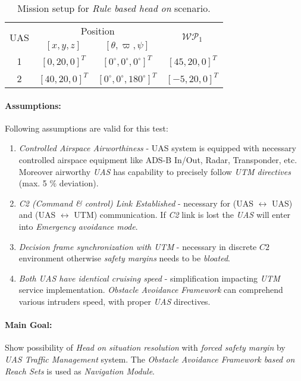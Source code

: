 \begin{table}[H]
    \centering
    \begin{tabular}{c||c|c||c}
        \multirow{2}{*}{UAS} &\multicolumn{2}{c||}{Position} & \multirow{2}{*}{$\mathscr{WP}_1$} \\\cline{2-3}
          & $[x,y,z]$           & $[\theta,\varpi,\psi]$           & \\\hline\hline
        1 & $[0,20,0]^T $       & $[0^\circ,0^\circ,0^\circ]^T$    & $[45,20,0]^T$\\\hline 
        2 & $[40,20,0]^T $       & $[0^\circ,0^\circ,180^\circ]^T$    & $[-5,20,0]^T$\\
    \end{tabular}
    \caption{Mission setup for \emph{Rule based head on} scenario.}
    \label{tab:missionSetupRuleBasedHeadOnScenario}
\end{table}

\paragraph{Assumptions:} Following assumptions are valid for this test:
    
\begin{enumerate}
    \item \emph{Controlled Airspace Airworthiness} - UAS system is equipped with necessary controlled airspace equipment like ADS-B In/Out, Radar, Transponder, etc. Moreover airworthy \emph{UAS} has capability to precisely follow \emph{UTM directives} (max. 5 $\%$ deviation).
    
    \item \emph{C2 (Command \& control) Link Established} - necessary for (UAS $\leftrightarrow$ UAS) and (UAS $\leftrightarrow$ UTM) communication. If \emph{C2} link is lost the \emph{UAS} will enter into \emph{Emergency avoidance mode}.
    
    \item \emph{Decision frame synchronization with UTM} - necessary in discrete $C2$ environment otherwise \emph{safety margins} needs to be \emph{bloated}.
    
    \item \emph{Both UAS have identical cruising speed} - simplification impacting \emph{UTM} service implementation. \emph{Obstacle Avoidance Framework} can comprehend various intruders speed, with proper \emph{UAS} directives.
\end{enumerate}

\paragraph{Main Goal:} Show possibility of \emph{Head on situation resolution} with \emph{forced safety margin} by \emph{UAS Traffic Management} system.  The \emph{Obstacle Avoidance Framework based on Reach Sets} is used as \emph{Navigation Module}.


